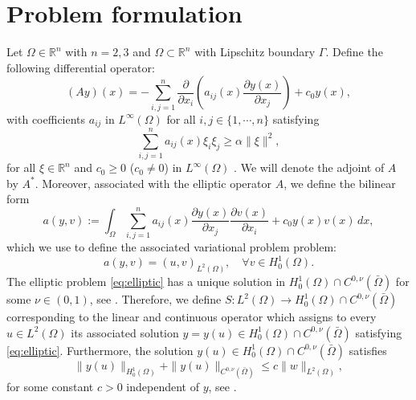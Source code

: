 \documentclass[11pt,a4paper]{amsart}
\newcommand{\arrow}{\rightarrow}
\renewcommand{\l}{\left}
\renewcommand{\r}{\right}
\newcommand{\om}{\Omega}
\newcommand{\reals}{\mathbb{R}}
\newcommand{\norm}[1]{\lVert #1 \rVert}
\begin{document}



\section{Problem formulation}
Let $\om \in \reals^{n}$ with $n=2, 3$ and $\om\subset \reals^{n}$ with Lipschitz boundary $\Gamma$. Define the following differential operator:
\[
    (Ay)(x) = - \sum_{i,j=1}^n \frac{\partial}{\partial x_i}	\l( a_{ij}(x)\frac{\partial y(x)} {\partial x_j }\r) +c_0 y(x),
\]
with coefficients  $a_{ij}$  in $L^\infty(\om)$ for all $i,j\in \{1,\cdots,n\}$ satisfying
\begin{equation}\label{pdecondition}
    \sum_{i,j=1}^{n}a_{ij}(x)\xi_{i}\xi_{j} \ge \alpha\norm{\xi}^2,
\end{equation}
for all $\xi\in \reals^n$ and $c_0 \geq 0$  ($c_0 \not =0$) in  $L^\infty(\om)$ . We will denote the adjoint of $A$ by $A^*$. Moreover, associated with the elliptic operator $A$, we define the bilinear form 
$$ a(y,v):= \int_{\om} \sum_{i,j=1}^n a_{ij}(x)\frac{\partial y(x)} {\partial x_j }\frac{\partial v(x)} {\partial x_i }  +c_0 y(x)v(x) \, dx, $$  which we use to define the associated variational problem problem:
%
\begin{equation}\label{eq:elliptic}
	a(y,v) = (u,v)_{L^2(\om)}, \quad \forall v\in H_0^{1}(\om).
\end{equation}
%
%
The elliptic problem \eqref{eq:elliptic} has a unique solution in $H^1_0(\om)\cap C^{0,\nu}(\bar\om)$ for some $\nu \in (0,1)$, see \cite[Theorem 2.1]{Casas_2020}. Therefore, we define $S:L^2(\om ) \arrow H_0^1(\om)  \cap C^{0,\nu}(\bar\om)$ corresponding to the linear and continuous operator which assigns to every $u \in L^2(\om)$ its associated solution $y=y(u) \in H_0^1(\om)\cap C^{0,\nu}(\bar\om)$ satisfying \eqref{eq:elliptic}. 
 Furthermore, the solution $y(u)\in H_0^1(\om)\cap C^{0,\nu}(\bar\om)$  satisfies
\begin{equation}
 \|y(u)\|_{H_0^1(\om)}  +    \|y(u)\|_{C^{0,\nu}(\bar\om)} \leq c \|w\|_{L^2(\om)},
\end{equation}
for some constant $c>0$ independent of $y$, see \cite{Casas_2020}.
\end{document}
